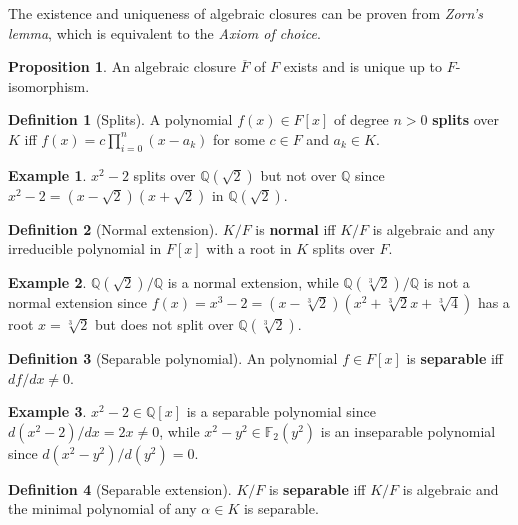 \documentclass{article}
\newcommand{\F}{\mathbb{F}}
\newcommand{\Q}{\mathbb{Q}}
\newcommand{\rb}[1]{\left( #1 \right)}
\renewcommand{\sb}[1]{\left[ #1 \right]}
\theoremstyle{definition}\newtheorem*{definition}{Definition}
\theoremstyle{definition}\newtheorem*{example}{Example}
\theoremstyle{definition}\newtheorem*{remark}{Remark}
\newtheorem{proposition}{Proposition}[subsection]
\begin{document}
The existence and uniqueness of algebraic closures can be proven from \emph{Zorn's lemma}, which is equivalent to the \emph{Axiom of choice}.

\begin{proposition}
An algebraic closure $ \overline{F} $ of $ F $ exists and is unique up to $ F $-isomorphism.
\end{proposition}

\begin{definition}[Splits]
A polynomial $ f\rb{x} \in F\sb{x} $ of degree $ n > 0 $ \textbf{splits} over $ K $ iff $ f\rb{x} = c\prod_{i = 0}^n \rb{x - a_k} $ for some $ c \in F $ and $ a_k \in K $.
\end{definition}

\begin{example}
$ x^2 - 2 $ splits over $ \Q\rb{\sqrt{2}} $ but not over $ \Q $ since $ x^2 - 2 = \rb{x - \sqrt{2}}\rb{x + \sqrt{2}} $ in $ \Q\rb{\sqrt{2}} $.
\end{example}

\begin{definition}[Normal extension]
$ K / F $ is \textbf{normal} iff $ K / F $ is algebraic and any irreducible polynomial in $ F\sb{x} $ with a root in $ K $ splits over $ F $.
\end{definition}

\begin{example}
$ \Q\rb{\sqrt{2}} / \Q $ is a normal extension, while $ \Q\rb{\sqrt[3]{2}} / \Q $ is not a normal extension since $ f\rb{x} = x^3 - 2 = \rb{x - \sqrt[3]{2}} \rb{x^2 + \sqrt[3]{2}x + \sqrt[3]{4}} $ has a root $ x = \sqrt[3]{2} $ but does not split over $ \Q\rb{\sqrt[3]{2}} $.
\end{example}

\begin{definition}[Separable polynomial]
An polynomial $ f \in F\sb{x} $ is \textbf{separable} iff $ df / dx \ne 0 $.
\end{definition}

\begin{example}
$ x^2 - 2 \in \Q\sb{x} $ is a separable polynomial since $ d\rb{x^2 - 2} / dx = 2x \ne 0 $, while $ x^2 - y^2 \in \F_2\rb{y^2} $ is an inseparable polynomial since $ d\rb{x^2 - y^2} / d\rb{y^2} = 0 $.
\end{example}

\begin{definition}[Separable extension]
$ K / F $ is \textbf{separable} iff $ K / F $ is algebraic and the minimal polynomial of any $ \alpha \in K $ is separable.
\end{definition}
\end{document}
